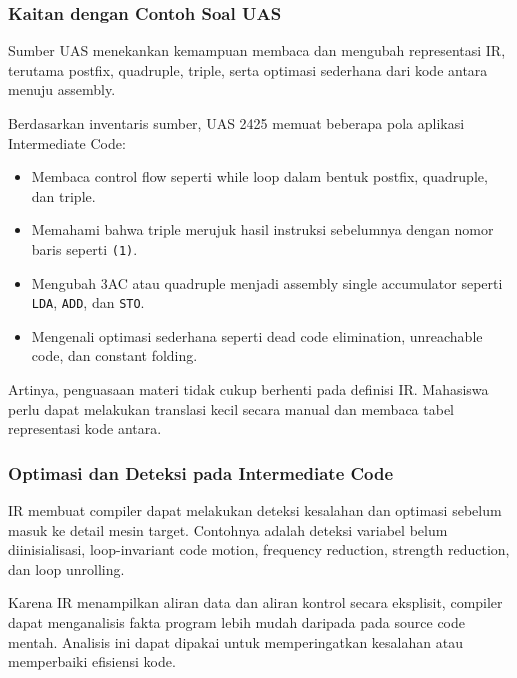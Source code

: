 \subsubsection{Kaitan dengan Contoh Soal UAS}

\begin{jawab}
Sumber UAS menekankan kemampuan membaca dan mengubah representasi IR, terutama postfix, quadruple, triple, serta optimasi sederhana dari kode antara menuju assembly.
\end{jawab}

Berdasarkan inventaris sumber, UAS 2425 memuat beberapa pola aplikasi Intermediate Code:
\begin{itemize}
    \item Membaca control flow seperti while loop dalam bentuk postfix, quadruple, dan triple.
    \item Memahami bahwa triple merujuk hasil instruksi sebelumnya dengan nomor baris seperti \texttt{(1)}.
    \item Mengubah 3AC atau quadruple menjadi assembly single accumulator seperti \texttt{LDA}, \texttt{ADD}, dan \texttt{STO}.
    \item Mengenali optimasi sederhana seperti dead code elimination, unreachable code, dan constant folding.
\end{itemize}

Artinya, penguasaan materi tidak cukup berhenti pada definisi IR. Mahasiswa perlu dapat melakukan translasi kecil secara manual dan membaca tabel representasi kode antara.

\subsubsection{Optimasi dan Deteksi pada Intermediate Code}

\begin{jawab}
IR membuat compiler dapat melakukan deteksi kesalahan dan optimasi sebelum masuk ke detail mesin target. Contohnya adalah deteksi variabel belum diinisialisasi, loop-invariant code motion, frequency reduction, strength reduction, dan loop unrolling.
\end{jawab}

Karena IR menampilkan aliran data dan aliran kontrol secara eksplisit, compiler dapat menganalisis fakta program lebih mudah daripada pada source code mentah. Analisis ini dapat dipakai untuk memperingatkan kesalahan atau memperbaiki efisiensi kode.

